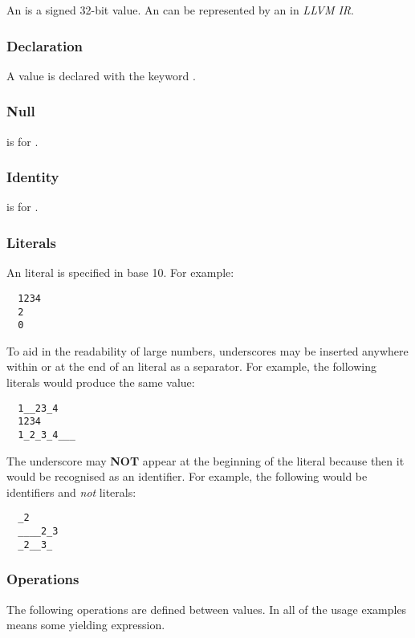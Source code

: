 \documentclass[types.tex]{subfiles}
\begin{document}
An  is a signed 32-bit value. An  can be represented by an  in
\textit{LLVM IR}.

\subsubsection{Declaration}
\label{sssec:integer_decl}
A  value is declared with the keyword .

\subsubsection{Null}
\label{sssec:integer_null}
 is  for .

\subsubsection{Identity}
\label{sssec:integer_ident}
 is  for .

\subsubsection{Literals}
\label{sssec:integer_lit}
An  literal is specified in base 10. For example:
\begin{lstlisting}
  1234
  2
  0
\end{lstlisting}

To aid in the readability of large numbers, underscores may be inserted anywhere within or at the
end of an  literal as a separator. For example, the following literals would produce
the same  value:
\begin{lstlisting}
  1__23_4
  1234
  1_2_3_4___
\end{lstlisting}

The underscore may \textbf{NOT} appear at the beginning of the  literal because then
it would be recognised as an identifier. For example, the following would be identifiers and
\textit{not}  literals:
\begin{lstlisting}
  _2
  ____2_3
  _2__3_
\end{lstlisting}

\subsubsection{Operations}
\label{sssec:integer_ops}
The following operations are defined between  values. In all of the usage examples
 means some  yielding expression.
\end{document}
